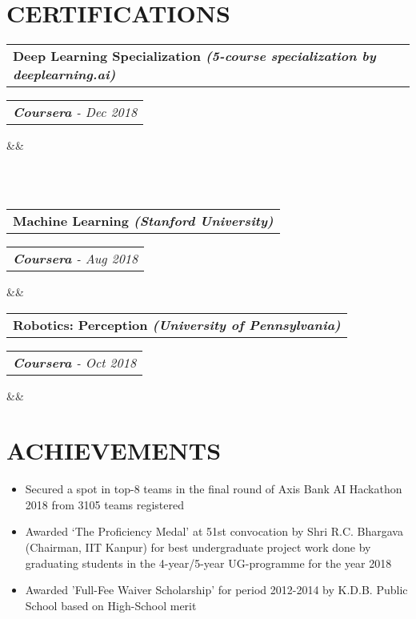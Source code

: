 \documentclass[6pt,a4paper,roman]{moderncv}        %
\makeatletter
\newcommand*{\customcvproject}[4][.25em]{
  \begin{tabular}{@{}l} 
    {\bfseries #2}
  \end{tabular}
  \hfill%
  \begin{tabular}{l@{}}
     {\itshape #3}
  \end{tabular}
  \ifx&#4&%
  \else{\\%
    \begin{minipage}{1.16\maincolumnwidth}%
      \small#4%
    \end{minipage}}\fi%
  \par\addvspace{#1}}%
\makeatother
\begin{document}
\section{ \large{CERTIFICATIONS}}
\vspace*{-1.5mm}
{\customcvproject{\small{Deep Learning Specialization \textit{(5-course specialization by deeplearning.ai)}} }{\small{\textbf{Coursera} - Dec 2018}}{}
{\begin{itemize}
   \hspace{2.5cm}   \\
   \hspace{3.37cm}
   \\
\end{itemize}
}

{\customcvproject{\small{Machine Learning \textit{(Stanford University)} }}{\small{\textbf{Coursera} - Aug 2018}}{}
{}


{\customcvproject{\small{Robotics: Perception \textit{(University of Pennsylvania)}}}{\small{\textbf {Coursera} - Oct 2018}}{}
{}

\vspace*{3mm}
\section{\large{ACHIEVEMENTS}}

\begin{minipage}{1.15\maincolumnwidth}%
	\small{
    	\begin{itemize}
          \item Secured a spot in top-8 teams in the final round of Axis Bank AI Hackathon 2018 from 3105 teams registered
          \item Awarded ‘The Proficiency Medal’ at 51st convocation by Shri R.C. Bhargava (Chairman, IIT Kanpur) for best undergraduate project work done by graduating students in the 4-year/5-year UG-programme for the year 2018
          \item Awarded 'Full-Fee Waiver Scholarship' for period 2012-2014 by K.D.B. Public School based on High-School merit
          \end{itemize}}%
\end{minipage}%
      


}}}
\end{document}
